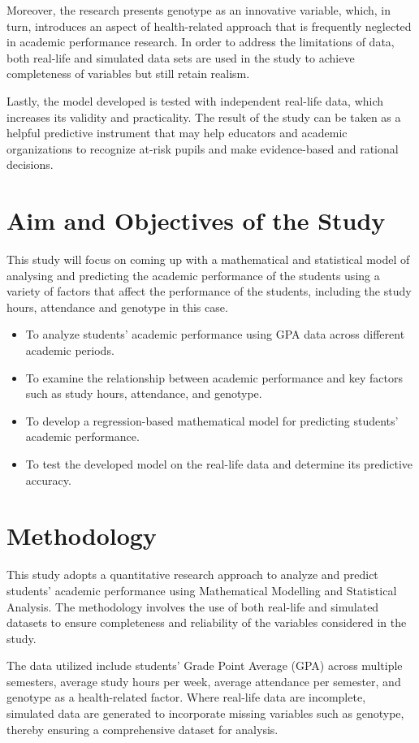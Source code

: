 \documentclass[12pt]{report}
\begin{document}
	Moreover, the research presents genotype as an innovative variable, which, in turn, introduces an aspect of health-related approach that is frequently neglected in academic performance research. In order to address the limitations of data, both real-life and simulated data sets are used in the study to achieve completeness of variables but still retain realism.
	
	Lastly, the model developed is tested with independent real-life data, which increases its validity and practicality. The result of the study can be taken as a helpful predictive instrument that may help educators and academic organizations to recognize at-risk pupils and make evidence-based and rational decisions.
	
	\section{Aim and Objectives of the Study}
	This study will focus on coming up with a mathematical and statistical model of analysing and predicting the academic performance of the students using a variety of factors that affect the performance of the students, including the study hours, attendance and genotype in this case.
	
	\begin{itemize}
		\item To analyze students’ academic performance using GPA data across different academic periods.
		\item To examine the relationship between academic performance and key factors such as study hours, attendance, and genotype.
		\item To develop a regression-based mathematical model for predicting students’ academic performance.
		\item To test the developed model on the real-life data and determine its predictive accuracy.
	\end{itemize}
	
	\section{Methodology}
	This study adopts a quantitative research approach to analyze and predict students’ academic performance using Mathematical Modelling and Statistical Analysis. The methodology involves the use of both real-life and simulated datasets to ensure completeness and reliability of the variables considered in the study.
	
	The data utilized include students’ Grade Point Average (GPA) across multiple semesters, average study hours per week, average attendance per semester, and genotype as a health-related factor. Where real-life data are incomplete, simulated data are generated to incorporate missing variables such as genotype, thereby ensuring a comprehensive dataset for analysis.
	
\end{document}
